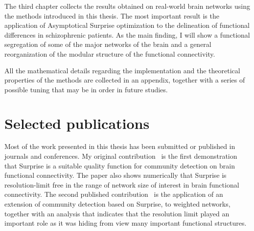 The third chapter collects the results obtained on real-world brain networks using the methods introduced in this thesis. The most important result is the application of Asymptotical Surprise optimization to the delineation of functional differences in schizophrenic patients. As the main finding, I will show a functional segregation of some of the major networks of the brain and a general reorganization of the modular structure of the functional connectivity.

All the mathematical details regarding the implementation and the theoretical properties of the methods are collected in an appendix, together with a series of possible tuning that may be in order in future studies.

\section*{Selected publications}
Most of the work presented in this thesis has been submitted or published in journals and conferences. My original contribution~\cite{nicolini2016} is the first demonstration that Surprise is a suitable quality function for community detection on brain functional connectivity.
The paper also shows numerically that Surprise is resolution-limit free in the range of network size of interest in brain functional connectivity.
The second published contribution~\cite{nicolini2017} is the application of an extension of community detection based on Surprise, to weighted networks, together with an analysis that indicates that the resolution limit played an important role as it was hiding from view many important functional structures.